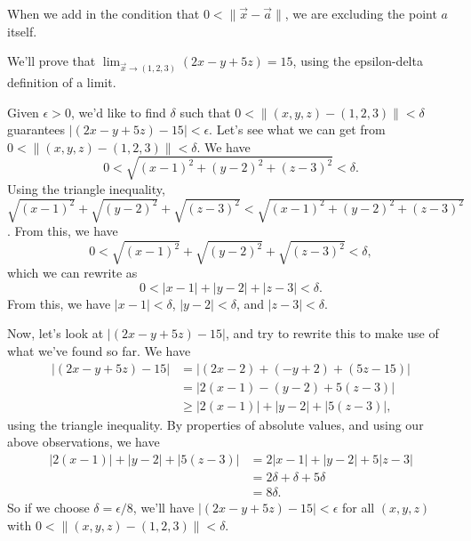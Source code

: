 \documentclass{ximera}
\begin{document}
\begin{image}
\end{image}

When we add in the condition that $0<\|\vec{x}-\vec{a}\|$, we are excluding the point $a$ itself.

\begin{example}
We'll prove that $\lim_{\vec{x}\rightarrow (1,2,3)} (2x-y+5z) = 15$, using the epsilon-delta definition of a limit.

Given $\epsilon >0$, we'd like to find $\delta$ such that $0< \|(x,y,z)-(1,2,3)\|<\delta$ guarantees $|(2x-y+5z)-15|<\epsilon$. Let's see what we can get from $0< \|(x,y,z)-(1,2,3)\|<\delta$. We have
\[
0< \sqrt{(x-1)^2+(y-2)^2+(z-3)^2}<\delta.
\]
Using the triangle inequality, $\sqrt{(x-1)^2}+\sqrt{(y-2)^2}+\sqrt{(z-3)^2} < \sqrt{(x-1)^2+(y-2)^2+(z-3)^2}$. From this, we have
\[
0< \sqrt{(x-1)^2}+\sqrt{(y-2)^2}+\sqrt{(z-3)^2}<\delta,
\]
which we can rewrite as
\[
0< |x-1|+|y-2|+|z-3|<\delta.
\]
From this, we have $|x-1|<\delta$, $|y-2|<\delta$, and $|z-3|<\delta$.

Now, let's look at $|(2x-y+5z)-15|$, and try to rewrite this to make use of what we've found so far. We have
\begin{align*}
 |(2x-y+5z)-15| &=|(2x-2)+(-y+2)+(5z-15)|\\
&=|2(x-1)-(y-2)+5(z-3)|\\
&\geq |2(x-1)|+|y-2|+|5(z-3)|,
\end{align*}
using the triangle inequality. By properties of absolute values, and using our above observations, we have
\begin{align*}
|2(x-1)|+|y-2|+|5(z-3)| &= 2|x-1|+|y-2|+5|z-3|\\
&=2\delta + \delta + 5\delta\\
&=8\delta.
\end{align*}
So if we choose $\delta = \epsilon/8$, we'll have $|(2x-y+5z)-15|<\epsilon$ for all $(x,y,z)$ with $0< \|(x,y,z)-(1,2,3)\|<\delta$.
\end{example}
\end{document}
